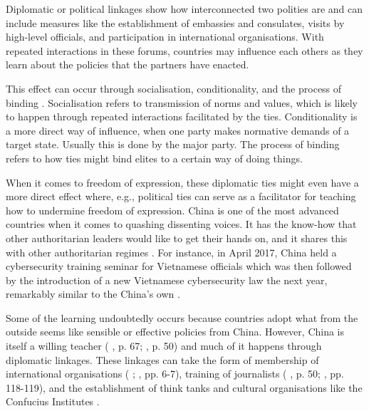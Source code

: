 Diplomatic or political linkages show how interconnected two polities are and can include measures like the establishment of embassies and consulates, visits by high-level officials, and participation in international organisations. With repeated interactions in these forums, countries may influence each others as they learn about the policies that the partners have enacted. 

This effect can occur through socialisation, conditionality, and the process of binding \citep[pp. 1323-1326]{ambrosio_catching_2008}. Socialisation refers to transmission of norms and values, which is likely to happen through repeated interactions facilitated by the ties. Conditionality is a more direct way of influence, when one party makes normative demands of a target state. Usually this is done by the major party. The process of binding refers to how ties might bind elites to a certain way of doing things.

When it comes to freedom of expression, these diplomatic ties might even have a more direct effect where, e.g., political ties can serve as a facilitator for teaching how to undermine freedom of expression. China is one of the most advanced countries when it comes to quashing dissenting voices. It has the know-how that other authoritarian leaders would like to get their hands on, and it shares this with other authoritarian regimes \citep[pp. 3-6]{economy_exporting_2020}. For instance, in April 2017, China held a cybersecurity training seminar for Vietnamese officials which was then followed by the introduction of a new Vietnamese cybersecurity law the next year, remarkably similar to the China's own \citep[p. 8]{shahbaz_rise_2018}. 

Some of the learning undoubtedly occurs because countries adopt what from the outside seems like sensible or effective policies from China. However, China is itself a willing teacher (\citeauthor{brazys_chinas_2020} \citeyear{brazys_chinas_2020}, p. 67; \citeauthor{repucci_authoritarians_2022} \citeyear{repucci_authoritarians_2022}, p. 50) and much of it happens through diplomatic linkages. These linkages can take the form of membership of international organisations (\citeauthor{ambrosio_catching_2008} \citeyear{ambrosio_catching_2008}; \citeauthor{economy_exporting_2020} \citeyear{economy_exporting_2020}, pp. 6-7), training of journalists (\citeauthor{brazys_chinas_2020} \citeyear{brazys_chinas_2020}, p. 50; \citeauthor{cook_countering_2022} \citeyear{cook_countering_2022}, pp. 118-119), and the establishment of think tanks \citep[pp. 15-16]{loughlin_chinese_2021} and cultural organisations like the Confucius Institutes \citep{popovic_charm_2020}. 


